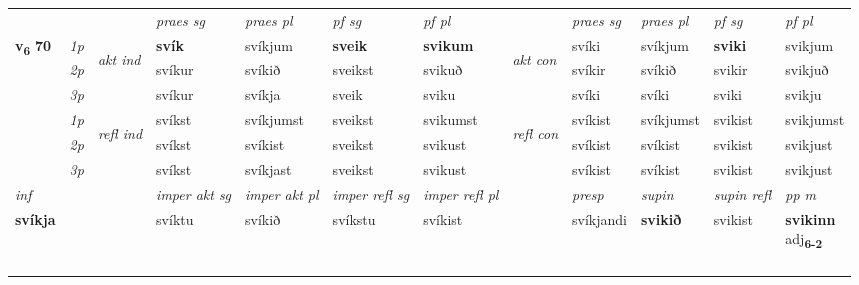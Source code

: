\begin{longtable}[l]{X>{\footnotesize\itshape}llXXXXlXXXX}
\midrule

 & &   & \textit{praes sg}  & \textit{praes pl}    & \textit{ pf sg} & \textit{pf pl} & & \textit{praes sg}  & \textit{praes pl}    & \textit{pf sg} & \textit{pf pl }  \\ \cmidrule{4-7} \cmidrule{9-12}
 \multirow{2}{*}{{{\textbf{v{\textsubscript{6}}} \Large{\textbf{70}}}}}  & 1p & \multirow{3}{*}{\begin{turn}{90}\textit{akt ind}\end{turn}} & \textbf{svík} & svíkjum & \textbf{sveik} & \textbf{svikum} & \multirow{3}{*}{\begin{turn}{90}\textit{akt con}\end{turn}} &svíki & svíkjum & \textbf{sviki} & svikjum\\*
 & 2p &  &  svíkur  & svíkið & sveikst & svikuð & & svíkir & svíkið & svikir & svikjuð \\*
 & 3p &  & svíkur & svíkja & sveik & sviku & & svíki & svíki& sviki & svikju \\*
\cmidrule{4-7} \cmidrule{9-12}
 & 1p & \multirow{3}{*}{\begin{turn}{90}\textit{refl ind}\end{turn}}  & svíkst & svíkjumst & sveikst & svikumst & \multirow{3}{*}{\begin{turn}{90}\textit{refl con}\end{turn}}  &svíkist & svíkjumst & svikist & svikjumst \\*
 & 2p &  & svíkst & svíkist & sveikst & svikust & &svíkist & svíkist & svikist & svikjust \\*
 & 3p  & & svíkst & svíkjast & sveikst & svikust & & svíkist & svíkist& svikist & svikjust \\*
\cmidrule{4-7} \cmidrule{9-12}

   {\textit{inf}} & &  & \textit{imper akt sg} & \textit{imper akt pl} & \textit{imper refl sg} & \textit{imper refl pl} && \textit{presp} & \textit{supin} & \textit{supin refl} & \textit{pp m} \\*
  {\textbf{svíkja}} & && svíktu  & svíkið & svíkstu & svíkist && svíkjandi &  \textbf{svikið} & svikist & \specialcell{\textbf{svikinn} \\ adj\textbf{\textsubscript{6-2}}} \\*

\midrule
& \\*
 & \\*
   & \\*
  & \\
  

\end{longtable}
